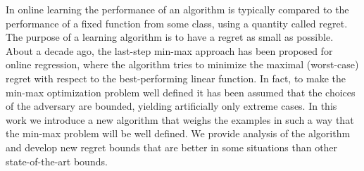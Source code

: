 \documentclass[MSc]{iitcsthesis}
\begin{document}






\maketitleEnglish

\abstractEnglish
In online learning the performance of an algorithm is typically compared to the performance of a fixed function from some class, using a quantity called regret. The purpose of a learning algorithm is to have a regret as small as possible. About a decade ago, the last-step min-max approach has been proposed for online regression, where the algorithm tries to minimize the maximal (worst-case) regret with respect to the best-performing linear function.
In fact, to make the min-max optimization problem well defined it has been assumed that the choices of the adversary are bounded, yielding artificially only extreme cases. In this work we introduce a new algorithm that weighs the examples in such a way that the min-max problem will be well defined. We provide analysis of the algorithm and develop new regret bounds that are better in some situations than other state-of-the-art bounds.
\end{document}
